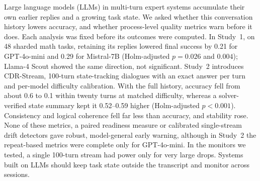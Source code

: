 Large language models (LLMs) in multi-turn expert systems accumulate
their own earlier replies and a growing task state. We asked whether this
conversation history lowers accuracy, and whether process-level quality
metrics warn before it does. Each analysis was fixed before its outcomes were
computed. In Study~1, on 48 sharded math tasks, retaining its replies
lowered final success by 0.21 for GPT-4o-mini and 0.29 for Mistral-7B
(Holm-adjusted $p=0.026$ and $0.004$); Llama-4 Scout showed the same
direction, not significant. Study~2 introduces CDR-Stream, 100-turn
state-tracking dialogues with an exact answer per turn and per-model
difficulty calibration. With the full history, accuracy fell from about 0.6 to
0.1 within twenty turns at matched difficulty, whereas a solver-verified state
summary kept it 0.52--0.59 higher (Holm-adjusted $p<0.001$). Consistency and
logical coherence fell far less than accuracy, and stability rose. None
of these metrics, a paired readiness measure or calibrated single-stream drift
detectors gave robust, model-general early warning, although in Study~2 the
repeat-based metrics were complete only for GPT-4o-mini. In the monitors we
tested, a single 100-turn stream had power only for very large drops. Systems
built on LLMs should keep task state outside the transcript and monitor across
sessions.
